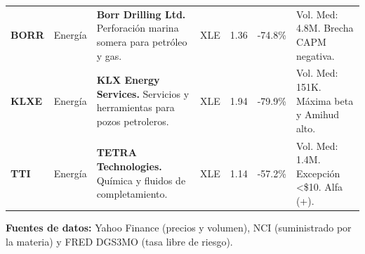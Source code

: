 \documentclass[9pt,a4paper]{article}
\begin{document}
{\begin{tabular}{llp{6.5cm}c<{\centering}c<{\centering}c<{\centering}p{5cm}}
\textbf{BORR} & Energía & \textbf{Borr Drilling Ltd.} Perforación marina somera para petróleo y gas. & XLE & 1.36 & -74.8\% & Vol. Med: 4.8M. Brecha CAPM negativa. \\

\textbf{KLXE} & Energía & \textbf{KLX Energy Services.} Servicios y herramientas para pozos petroleros. & XLE & 1.94 & -79.9\% & Vol. Med: 151K. Máxima beta y Amihud alto. \\

\textbf{TTI} & Energía & \textbf{TETRA Technologies.} Química y fluidos de completamiento. & XLE & 1.14 & -57.2\% & Vol. Med: 1.4M. Excepción <\$10. Alfa (+). \\\bottomrule
\end{tabular}%
}

\vspace{0.1cm}
{\tiny\textbf{Fuentes de datos:} Yahoo Finance (precios y volumen), NCI (suministrado por la materia) y FRED DGS3MO (tasa libre de riesgo).}
\end{document}
